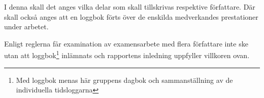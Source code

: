 \documentclass[../rapport_MVEX01-11-05]{subfiles}
\begin{document}
I denna skall det anges vilka delar som skall tillskrivas respektive
författare. Där skall också anges att en loggbok förts över de
enskilda medverkandes prestationer under arbetet.

Enligt reglerna får examination av examensarbete med flera författare
inte ske utan att loggbok\footnote{Med loggbok menas här gruppens
dagbok och sammanställning av de individuella tidsloggarna} inlämnats
och rapportens inledning uppfyller villkoren ovan.
\end{document}

